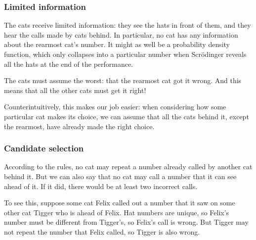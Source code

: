\documentclass[10pt,a4paper]{scrartcl}
\begin{document}
\subsubsection{Limited information}

The cats receive limited information: they see the hats in front of them, and
they hear the calls made by cats behind. In particular, no cat has any
information about the rearmost cat's number. It might as well be a probability
density function, which only collapses into a particular number when
Scr\"odinger reveals all the hats at the end of the performance.

The cats must assume the worst: that the rearmost cat got it wrong. And this
means that all the other cats must get it right!

Counterintuitively, this makes our job easier: when considering how some
particular cat makes its choice, we can assume that all the cats behind it,
except the rearmost, have already made the right choice.

\subsubsection{Candidate selection}

According to the rules, no cat may repeat a number already called by another
cat behind it. But we can also say that no cat may call a number that it can
see ahead of it. If it did, there would be at least two incorrect calls.

To see this, suppose some cat Felix called out a number that it saw on some
other cat Tigger who is ahead of Felix. Hat numbers are unique, so Felix's
number must be different from Tigger's, so Felix's call is wrong. But Tigger
may not repeat the number that Felix called, so Tigger is also wrong.


\end{document}
